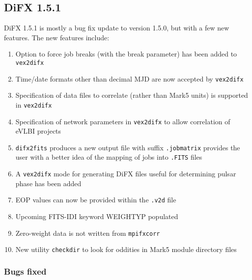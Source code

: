 \subsection{DiFX 1.5.1}

DiFX 1.5.1 is mostly a bug fix update to version 1.5.0, but with a few new features.
The new features include:
\begin{enumerate}
\item Option to force job breaks (with the break parameter) has been added to {\tt vex2difx}
\item Time/date formats other than decimal MJD are now accepted by {\tt vex2difx}
\item Specification of data files to correlate (rather than Mark5 units) is supported in {\tt vex2difx}
\item Specification of network parameters in {\tt vex2difx} to allow correlation of eVLBI projects
\item {\tt difx2fits} produces a new output file with suffix {\tt .jobmatrix} provides the user with a better idea of the mapping of jobs into {\tt .FITS} files
\item A {\tt vex2difx} mode for generating DiFX files useful for determining pulsar phase has been added
\item EOP values can now be provided within the {\tt .v2d} file
\item Upcoming FITS-IDI keyword WEIGHTYP populated
\item Zero-weight data is not written from {\tt mpifxcorr}
\item New utility {\tt checkdir} to look for oddities in Mark5 module directory files
\end{enumerate}

\subsubsection{Bugs fixed}


